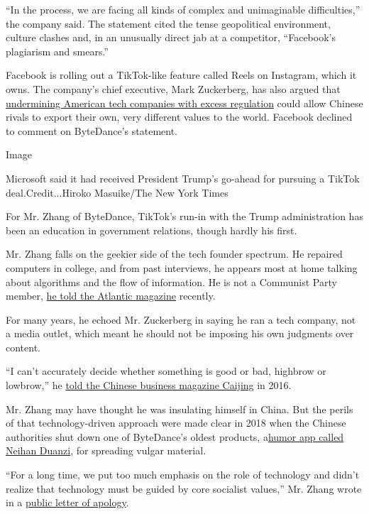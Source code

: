 ``In the process, we are facing all kinds of complex and unimaginable
difficulties,'' the company said. The statement cited the tense
geopolitical environment, culture clashes and, in an unusually direct
jab at a competitor, ``Facebook's plagiarism and smears.''

Facebook is rolling out a TikTok-like feature called Reels on Instagram,
which it owns. The company's chief executive, Mark Zuckerberg, has also
argued that
\href{https://docs.house.gov/meetings/JU/JU05/20200729/110883/HHRG-116-JU05-Wstate-ZuckerbergM-20200729.pdf}{undermining
American tech companies with excess regulation} could allow Chinese
rivals to export their own, very different values to the world. Facebook
declined to comment on ByteDance's statement.

Image

Microsoft said it had received President Trump's go-ahead for pursuing a
TikTok deal.Credit...Hiroko Masuike/The New York Times

For Mr. Zhang of ByteDance, TikTok's run-in with the Trump
administration has been an education in government relations, though
hardly his first.

Mr. Zhang falls on the geekier side of the tech founder spectrum. He
repaired computers in college, and from past interviews, he appears most
at home talking about algorithms and the flow of information. He is not
a Communist Party member,
\href{https://www.theatlantic.com/international/archive/2020/07/tiktok-ban-china-america/614725/}{he
told the Atlantic magazine} recently.

For many years, he echoed Mr. Zuckerberg in saying he ran a tech
company, not a media outlet, which meant he should not be imposing his
own judgments over content.

``I can't accurately decide whether something is good or bad, highbrow
or lowbrow,'' he \href{https://36kr.com/p/1721289883649}{told the
Chinese business magazine Caijing} in 2016.

Mr. Zhang may have thought he was insulating himself in China. But the
perils of that technology-driven approach were made clear in 2018 when
the Chinese authorities shut down one of ByteDance's oldest products,
a\href{https://www.nytimes3xbfgragh.onion/2018/04/11/technology/china-toutiao-bytedance-censor.html}{humor
app called Neihan Duanzi}, for spreading vulgar material.

``For a long time, we put too much emphasis on the role of technology
and didn't realize that technology must be guided by core socialist
values,'' Mr. Zhang wrote in a
\href{https://mp.weixin.qq.com/s/4r6rCwNE7BgTLD37cPJOoA}{public letter
of apology}.


